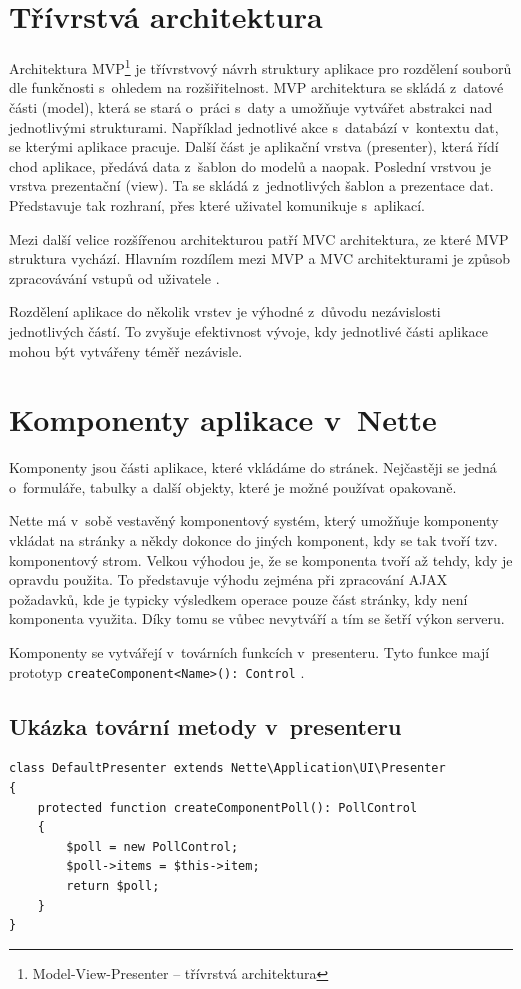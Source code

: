 \documentclass[czech,BP]{thesiskiv}
\begin{document}
		\section{Třívrstvá architektura}
		\par Architektura MVP\footnote{Model-View-Presenter -- třívrstvá architektura} je třívrstvový návrh struktury aplikace pro rozdělení souborů dle funkčnosti s~ohledem na rozšiřitelnost. MVP architektura se skládá z~datové části (model), která se stará o~práci s~daty a umožňuje vytvářet abstrakci nad jednotlivými strukturami. Například jednotlivé akce s~databází v~kontextu dat, se kterými aplikace pracuje. Další část je aplikační vrstva (presenter), která řídí chod aplikace, předává data z~šablon do modelů a naopak. Poslední vrstvou je vrstva prezentační (view). Ta se skládá z~jednotlivých šablon a prezentace dat. Představuje tak rozhraní, přes které uživatel komunikuje s~aplikací.
		\par Mezi další velice rozšířenou architekturou patří MVC architektura, ze které MVP struktura vychází. Hlavním rozdílem mezi MVP a MVC architekturami je způsob zpracovávání vstupů od uživatele \cite{3Vrstvy}.
		\par Rozdělení aplikace do několik vrstev je výhodné z~důvodu nezávislosti jednotlivých částí. To zvyšuje efektivnost vývoje, kdy jednotlivé části aplikace mohou být vytvářeny téměř nezávisle.
		
		\section{Komponenty aplikace v~Nette}
		\par Komponenty jsou části aplikace, které vkládáme do stránek. Nejčastěji se jedná o~formuláře, tabulky a další objekty, které je možné používat opakovaně.
		\par Nette má v~sobě vestavěný komponentový systém, který umožňuje komponenty vkládat na stránky a někdy dokonce do jiných komponent, kdy se tak tvoří tzv. komponentový strom. Velkou výhodou je, že se komponenta tvoří až tehdy, kdy je opravdu použita. To představuje výhodu zejména při zpracování AJAX požadavků, kde je typicky výsledkem operace pouze část stránky, kdy není komponenta využita. Díky tomu se vůbec nevytváří a tím se šetří výkon serveru.
		\par Komponenty se vytvářejí v~továrních funkcích v~presenteru. Tyto funkce mají prototyp \texttt{createComponent<Name>(): Control} \cite{NetteComponents}.
		
		\subsection{Ukázka tovární metody v~presenteru}
		\begin{lstlisting}[caption={Ukázka tovární metody v~presenteru}]
class DefaultPresenter extends Nette\Application\UI\Presenter
{
	protected function createComponentPoll(): PollControl
	{
		$poll = new PollControl;
		$poll->items = $this->item;
		return $poll;
	}
}
\end{lstlisting}
		
\end{document}
